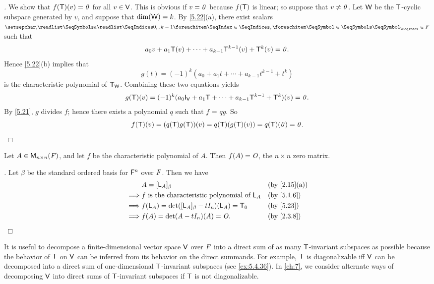 \begin{proof}[]
	We show that \(f(\mathsf{T})(v) = \mathit{0}\) for all \(v \in \mathsf{V}\).
	This is obvious if \(v = \mathit{0}\) because \(f(\mathsf{T})\) is linear;
	so suppose that \(v \neq \mathit{0}\).
	Let \(\mathsf{W}\) be the \(\mathsf{T}\)-cyclic subspace generated by \(v\), and suppose that \(\dim(\mathsf{W}) = k\).
	By \cref{5.22}(a), there exist scalars \(\seq{a}{0,,k-1} \in \F\) such that
	\[
		a_0 v + a_1 \mathsf{T}(v) + \cdots + a_{k - 1} \mathsf{T}^{k - 1}(v) + \mathsf{T}^k(v) = \mathit{0}.
	\]
	Hence \cref{5.22}(b) implies that
	\[
		g(t) = (-1)^k (a_0 + a_1 t + \cdots + a_{k - 1} t^{k - 1} + t^k)
	\]
	is the characteristic polynomial of \(\mathsf{T}_{\mathsf{W}}\).
	Combining these two equations yields
	\[
		g(\T)(v) = (-1)^k (a_0 \IT[\V] + a_1 \T + \cdots + a_{k - 1} \T^{k - 1} + \T^k)(v) = \zv.
	\]
	By \cref{5.21}, \(g\) divides \(f\);
	hence there exists a polynomial \(q\) such that \(f\) = \(qg\).
	So
	\[
		f(\mathsf{T})(v) = (q(\mathsf{T}) g(\mathsf{T}))(v) = q(\mathsf{T})(g(\mathsf{T})(v)) = q(\mathsf{T})(\mathit{0}) = \mathit{0}.
	\]
\end{proof}

\begin{cor}\label{5.4.4}
	Let \(A \in \ms[n][n][\F]\), and let \(f\) be the characteristic polynomial of \(A\).
	Then \(f(A) = \mathit{O}\), the \(n \times n\) zero matrix.
\end{cor}

\begin{proof}[]
	Let \(\beta\) be the standard ordered basis for \(\mathsf{F}^n\) over \(\mathit{F}\).
	Then we have
	\begin{align*}
		         & A = [\L_A]_{\beta}                                  &  & \by{2.15}[a] \\
		\implies & f \text{ is the characteristic polynomial of } \L_A &  & \by{5.1.6}   \\
		\implies & f(\L_A) = \det([\L_A]_{\beta} - t I_n)(\L_A) = \zT  &  & \by{5.23}    \\
		\implies & f(A) = \det(A - t I_n)(A) = \zm.                    &  & \by{2.3.8}
	\end{align*}
\end{proof}

\begin{note}
	It is useful to decompose a finite-dimensional vector space \(\mathsf{V}\) over \(\mathit{F}\) into a direct sum of as many \(\mathsf{T}\)-invariant subspaces as possible because the behavior of \(\mathsf{T}\) on \(\mathsf{V}\) can be inferred from its behavior on the direct summands.
	For example, \(\mathsf{T}\) is diagonalizable iff \(\mathsf{V}\) can be decomposed into a direct sum of one-dimensional \(\mathsf{T}\)-invariant subspaces (see \cref{ex:5.4.36}).
	In \cref{ch:7}, we consider alternate ways of decomposing \(\mathsf{V}\) into direct sums of \(\mathsf{T}\)-invariant subspaces if \(\mathsf{T}\) is not diagonalizable.
\end{note}

